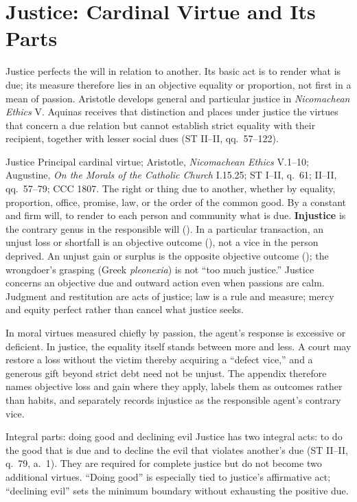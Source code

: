 \section{Justice: Cardinal Virtue and Its Parts}
\label{sec:justice}

Justice perfects the will in relation to another. Its basic act is to render what is due; its measure therefore lies in an objective equality or proportion, not first in a mean of passion. Aristotle develops general and particular justice in \emph{Nicomachean Ethics} V. Aquinas receives that distinction and places under justice the virtues that concern a due relation but cannot establish strict equality with their recipient, together with lesser social dues (ST II--II, qq.~57--122).


\virtuedossier
  {Justice}
  {Principal cardinal virtue; Aristotle, \emph{Nicomachean Ethics} V.1--10; Augustine, \emph{On the Morals of the Catholic Church} I.15.25; ST I--II, q.~61; II--II, qq.~57--79; CCC 1807.}
  {The right or thing due to another, whether by equality, proportion, office, promise, law, or the order of the common good.}
  {By a constant and firm will, to render to each person and community what is due.}
  {\textbf{Injustice} is the contrary genus in the responsible will (). In a particular transaction, an unjust loss or shortfall is an objective outcome (), not a vice in the person deprived.}
  {An unjust gain or surplus is the opposite objective outcome (); the wrongdoer's grasping (Greek \emph{pleonexia}) is not “too much justice.”}
  {Justice concerns an objective due and outward action even when passions are calm. Judgment and restitution are acts of justice; law is a rule and measure; mercy and equity perfect rather than cancel what justice seeks.}

In moral virtues measured chiefly by passion, the agent's response is excessive or deficient. In justice, the equality itself stands between more and less. A court may restore a loss without the victim thereby acquiring a “defect vice,” and a generous gift beyond strict debt need not be unjust. The appendix therefore names objective loss and gain where they apply, labels them as outcomes rather than habits, and separately records injustice as the responsible agent's contrary vice.

\begin{studybox}{Integral parts: doing good and declining evil}
Justice has two integral acts: to do the good that is due and to decline the evil that violates another's due (ST II--II, q.~79, a.~1). They are required for complete justice but do not become two additional virtues. “Doing good” is especially tied to justice's affirmative act; “declining evil” sets the minimum boundary without exhausting the positive due.
\end{studybox}

